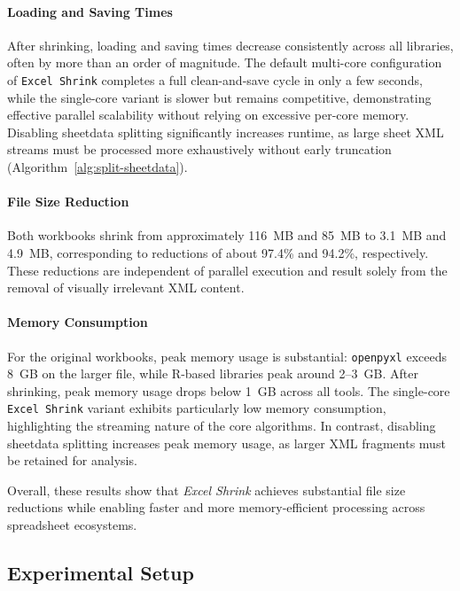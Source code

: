 \documentclass[conference]{IEEEtran}
\begin{document}
\paragraph{Loading and Saving Times}
After shrinking, loading and saving times decrease
consistently across all libraries, often by more than an order of magnitude.
The default multi-core configuration of \texttt{Excel~Shrink} completes a full
clean-and-save cycle in only a few seconds, while the single-core variant is
slower but remains competitive, demonstrating effective parallel scalability
without relying on excessive per-core memory. Disabling sheetdata splitting
significantly increases runtime, as large sheet XML streams must be processed
more exhaustively without early truncation (Algorithm~\ref{alg:split-sheetdata}).

\paragraph{File Size Reduction}
Both workbooks shrink from approximately 116~MB and 85~MB to 3.1~MB and 4.9~MB,
corresponding to reductions of about 97.4\% and 94.2\%, respectively. These
reductions are independent of parallel execution and result solely from the
removal of visually irrelevant XML content.

\paragraph{Memory Consumption}
For the original workbooks, peak memory usage is substantial:
\texttt{openpyxl} exceeds 8~GB on the larger file, while R-based libraries peak
around 2--3~GB. After shrinking, peak memory usage drops below 1~GB across all
tools. The single-core \texttt{Excel~Shrink} variant exhibits particularly low
memory consumption, highlighting the streaming nature of the core algorithms.
In contrast, disabling sheetdata splitting increases peak memory usage, as
larger XML fragments must be retained for analysis.

Overall, these results show that \textit{Excel Shrink} achieves substantial file
size reductions while enabling faster and more memory-efficient processing
across spreadsheet ecosystems.





\subsection{Experimental Setup}
\label{sec:experimental-setup}
\end{document}
